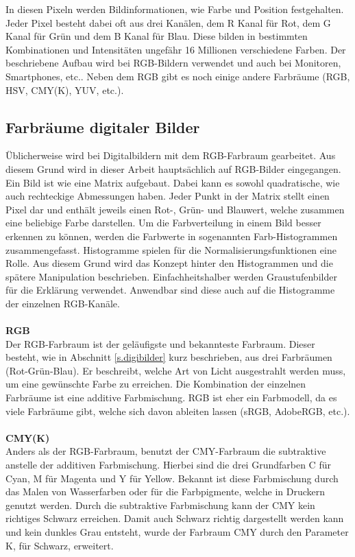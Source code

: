 In diesen Pixeln werden Bildinformationen, wie Farbe und Position festgehalten. Jeder Pixel besteht dabei oft aus drei Kanälen, dem R Kanal für Rot, dem G Kanal für Grün und dem B Kanal für Blau. Diese bilden in bestimmten Kombinationen und Intensitäten ungefähr 16 Millionen verschiedene Farben. Der beschriebene Aufbau wird bei RGB-Bildern verwendet und auch bei Monitoren, Smartphones, etc.. Neben dem RGB gibt es noch einige andere Farbräume \cite{farbmodell2019uni} (RGB, HSV, CMY(K), YUV, etc.).
\subsection{Farbräume digitaler Bilder}\label{s.aufbdigibilder}
Üblicherweise wird bei Digitalbildern mit dem RGB-Farbraum gearbeitet. Aus diesem Grund wird in dieser Arbeit hauptsächlich auf RGB-Bilder eingegangen. Ein Bild ist wie eine Matrix aufgebaut. Dabei kann es sowohl quadratische, wie auch rechteckige Abmessungen haben. Jeder Punkt in der Matrix stellt einen Pixel dar und enthält jeweils einen Rot-, Grün- und Blauwert, welche zusammen eine beliebige Farbe darstellen. Um die Farbverteilung in einem Bild besser erkennen zu können, werden die Farbwerte in sogenannten Farb-Histogrammen zusammengefasst. Histogramme spielen für die Normalisierungsfunktionen eine Rolle. Aus diesem Grund wird das Konzept hinter den Histogrammen und die spätere Manipulation beschrieben. Einfachheitshalber werden Graustufenbilder für die Erklärung verwendet. Anwendbar sind diese auch auf die Histogramme der einzelnen RGB-Kanäle.\\\\
\textbf{RGB}\label{s.rgb}\\
Der RGB-Farbraum ist der geläufigste und bekannteste Farbraum. Dieser besteht, wie in Abschnitt \ref{s.digibilder} kurz beschrieben, aus drei Farbräumen (Rot-Grün-Blau). Er beschreibt, welche Art von Licht ausgestrahlt werden muss, um eine gewünschte Farbe zu erreichen. Die Kombination der einzelnen Farbräume ist eine additive Farbmischung. RGB ist eher ein Farbmodell, da es viele Farbräume gibt, welche sich davon ableiten lassen (sRGB, AdobeRGB, etc.).\\\\
\textbf{CMY(K)}\label{s.cmy}\\
Anders als der RGB-Farbraum, benutzt der CMY-Farbraum die subtraktive anstelle der additiven Farbmischung. Hierbei sind die drei Grundfarben C für Cyan, M für Magenta und Y für Yellow. Bekannt ist diese Farbmischung durch das Malen von Wasserfarben oder für die Farbpigmente, welche in Druckern genutzt werden. Durch die subtraktive Farbmischung kann der CMY kein richtiges Schwarz erreichen. Damit auch Schwarz richtig dargestellt werden kann und kein dunkles Grau entsteht, wurde der Farbraum CMY durch den Parameter K, für Schwarz, erweitert.\\\\
